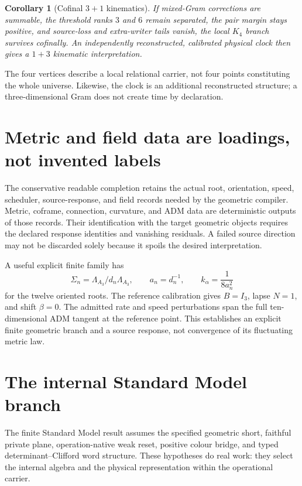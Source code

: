 \documentclass[11pt,a4paper,oneside]{book}
\theoremstyle{plain}
\newtheorem{corollary}[theorem]{Corollary}
\theoremstyle{definition}
\theoremstyle{remark}
\newcommand{\src}[2]{\cite{#1}}
\begin{document}
\begin{corollary}[Cofinal $3+1$ kinematics]
\label{cor:3plus1}
If mixed-Gram corrections are summable, the threshold ranks $3$ and $6$ remain separated, the pair margin stays positive, and source-loss and extra-writer tails vanish, the local $K_4$ branch survives cofinally. An independently reconstructed, calibrated physical clock then gives a $1+3$ kinematic interpretation.
\end{corollary}
\src{GT}{cor:dimension-cofinal-3plus1}
The four vertices describe a local relational carrier, not four points constituting the whole universe. Likewise, the clock is an additional reconstructed structure; a three-dimensional Gram does not create time by declaration.

\section{Metric and field data are loadings, not invented labels}
The conservative readable completion retains the actual root, orientation, speed, scheduler, source-response, and field records needed by the geometric compiler. Metric, coframe, connection, curvature, and ADM data are deterministic outputs of those records. Their identification with the target geometric objects requires the declared response identities and vanishing residuals. A failed source direction may not be discarded solely because it spoils the desired interpretation.

A useful explicit finite family has
\begin{equation}
 \Sigma_n=\Lambda_{A_3}/d_n\Lambda_{A_3},\qquad a_n=d_n^{-1},
 \qquad k_\alpha=\frac1{8a_n^2}
 \label{eq:a3-rates}
\end{equation}
for the twelve oriented roots. The reference calibration gives $B=I_3$, lapse $N=1$, and shift $\beta=0$. The admitted rate and speed perturbations span the full ten-dimensional ADM tangent at the reference point. This establishes an explicit finite geometric branch and a source response, not convergence of its fluctuating metric law. \cite{GT}

\section{The internal Standard Model branch}
The finite Standard Model result assumes the specified geometric short, faithful private plane, operation-native weak reset, positive colour bridge, and typed determinant--Clifford word structure. These hypotheses do real work: they select the internal algebra and the physical representation within the operational carrier.
\end{document}
